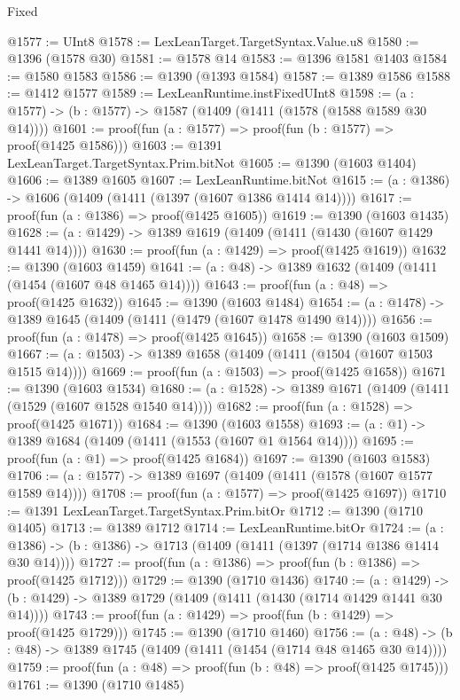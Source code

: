 \begin{lexlean}{Fixed}
\begin{coremodule}
@1577 := UInt8
@1578 := LexLeanTarget.TargetSyntax.Value.u8
@1580 := @1396 (@1578 @30)
@1581 := @1578 @14
@1583 := @1396 @1581 @1403
@1584 := @1580 @1583
@1586 := @1390 (@1393 @1584)
@1587 := @1389 @1586
@1588 := @1412 @1577
@1589 := LexLeanRuntime.instFixedUInt8
@1598 := (a : @1577) -> (b : @1577) -> @1587 (@1409 (@1411 (@1578 (@1588 @1589 @30 @14))))
@1601 := proof(fun (a : @1577) => proof(fun (b : @1577) => proof(@1425 @1586)))
@1603 := @1391 LexLeanTarget.TargetSyntax.Prim.bitNot
@1605 := @1390 (@1603 @1404)
@1606 := @1389 @1605
@1607 := LexLeanRuntime.bitNot
@1615 := (a : @1386) -> @1606 (@1409 (@1411 (@1397 (@1607 @1386 @1414 @14))))
@1617 := proof(fun (a : @1386) => proof(@1425 @1605))
@1619 := @1390 (@1603 @1435)
@1628 := (a : @1429) -> @1389 @1619 (@1409 (@1411 (@1430 (@1607 @1429 @1441 @14))))
@1630 := proof(fun (a : @1429) => proof(@1425 @1619))
@1632 := @1390 (@1603 @1459)
@1641 := (a : @48) -> @1389 @1632 (@1409 (@1411 (@1454 (@1607 @48 @1465 @14))))
@1643 := proof(fun (a : @48) => proof(@1425 @1632))
@1645 := @1390 (@1603 @1484)
@1654 := (a : @1478) -> @1389 @1645 (@1409 (@1411 (@1479 (@1607 @1478 @1490 @14))))
@1656 := proof(fun (a : @1478) => proof(@1425 @1645))
@1658 := @1390 (@1603 @1509)
@1667 := (a : @1503) -> @1389 @1658 (@1409 (@1411 (@1504 (@1607 @1503 @1515 @14))))
@1669 := proof(fun (a : @1503) => proof(@1425 @1658))
@1671 := @1390 (@1603 @1534)
@1680 := (a : @1528) -> @1389 @1671 (@1409 (@1411 (@1529 (@1607 @1528 @1540 @14))))
@1682 := proof(fun (a : @1528) => proof(@1425 @1671))
@1684 := @1390 (@1603 @1558)
@1693 := (a : @1) -> @1389 @1684 (@1409 (@1411 (@1553 (@1607 @1 @1564 @14))))
@1695 := proof(fun (a : @1) => proof(@1425 @1684))
@1697 := @1390 (@1603 @1583)
@1706 := (a : @1577) -> @1389 @1697 (@1409 (@1411 (@1578 (@1607 @1577 @1589 @14))))
@1708 := proof(fun (a : @1577) => proof(@1425 @1697))
@1710 := @1391 LexLeanTarget.TargetSyntax.Prim.bitOr
@1712 := @1390 (@1710 @1405)
@1713 := @1389 @1712
@1714 := LexLeanRuntime.bitOr
@1724 := (a : @1386) -> (b : @1386) -> @1713 (@1409 (@1411 (@1397 (@1714 @1386 @1414 @30 @14))))
@1727 := proof(fun (a : @1386) => proof(fun (b : @1386) => proof(@1425 @1712)))
@1729 := @1390 (@1710 @1436)
@1740 := (a : @1429) ->
  (b : @1429) -> @1389 @1729 (@1409 (@1411 (@1430 (@1714 @1429 @1441 @30 @14))))
@1743 := proof(fun (a : @1429) => proof(fun (b : @1429) => proof(@1425 @1729)))
@1745 := @1390 (@1710 @1460)
@1756 := (a : @48) -> (b : @48) -> @1389 @1745 (@1409 (@1411 (@1454 (@1714 @48 @1465 @30 @14))))
@1759 := proof(fun (a : @48) => proof(fun (b : @48) => proof(@1425 @1745)))
@1761 := @1390 (@1710 @1485)

\end{coremodule}
\end{lexlean}
